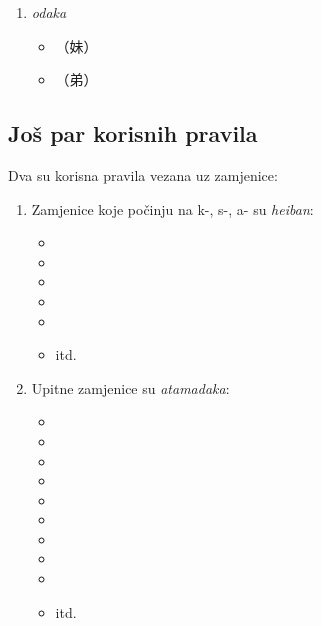\begin{enumerate}
\begin{multicols}{3}
\begin{itemize}
			\item {}（案内）
			\item {}（一昨日）
			\item {}
			\item {}（失礼）
			\item {}（飲み物）
		\end{itemize}
	\end{multicols}
	\item \textit{odaka}
	\begin{multicols}{3}
		\begin{itemize}
			\item {}（妹）
			\item {}（弟）
		\end{itemize}
	\end{multicols}
\end{enumerate}

\subsection{Još par korisnih pravila}
Dva su korisna pravila vezana uz zamjenice:
\begin{enumerate}
	\item Zamjenice koje počinju na k-, s-, a- su \textit{heiban}:
	\begin{multicols}{6}
		\begin{itemize} 
			\item {}
			\item {}
			\item {}
			\item {}
			\item {}
			\item {}itd.
		\end{itemize}
	\end{multicols}
	\item Upitne zamjenice su \textit{atamadaka}:
	\begin{multicols}{6}
		\begin{itemize}
			\item {}
			\item {}
			\item {}
			\item {}
			\item {}
			\item {}
			\item {}
			\item {}
			\item {}
			\item {}itd.
		\end{itemize}
	\end{multicols}
\end{enumerate}

